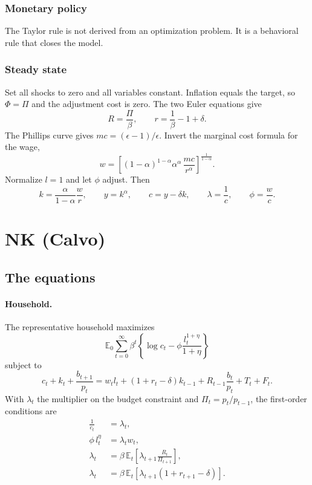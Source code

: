 \documentclass[11pt]{article}
\begin{document}
\subsubsection{Monetary policy}

The Taylor rule is not derived from an optimization problem. It is a behavioral rule that closes the model.

\subsubsection{Steady state}

Set all shocks to zero and all variables constant. Inflation equals the target, so $\Phi = \Pi$ and the adjustment cost is zero. The two Euler equations give
\begin{equation*}
R = \frac{\Pi}{\beta}, \qquad r = \frac{1}{\beta} - 1 + \delta .
\end{equation*}
The Phillips curve gives $mc = (\epsilon-1)/\epsilon$. Invert the marginal cost formula for the wage,
\begin{equation*}
w = \left[ (1-\alpha)^{1-\alpha} \alpha^{\alpha}\, \frac{mc}{r^{\alpha}} \right]^{\frac{1}{1-\alpha}} .
\end{equation*}
Normalize $l = 1$ and let $\phi$ adjust. Then
\begin{equation*}
k = \frac{\alpha}{1-\alpha} \frac{w}{r}, \qquad
y = k^{\alpha}, \qquad
c = y - \delta k, \qquad
\lambda = \frac{1}{c}, \qquad
\phi = \frac{w}{c} .
\end{equation*}

\section{NK (Calvo)}

\subsection{The equations}

\paragraph{Household.} The representative household maximizes
\begin{equation*}
\mathbb{E}_0 \sum_{t=0}^{\infty} \beta^t \left\{ \log c_t - \phi \frac{l_t^{1+\eta}}{1+\eta} \right\}
\end{equation*}
subject to
\begin{equation*}
c_t + k_t + \frac{b_{t+1}}{p_t} = w_t l_t + (1 + r_t - \delta) k_{t-1} + R_{t-1} \frac{b_t}{p_t} + T_t + F_t .
\end{equation*}
With $\lambda_t$ the multiplier on the budget constraint and $\Pi_t = p_t/p_{t-1}$, the first-order conditions are
\begin{align}
\frac{1}{c_t} &= \lambda_t, \\
\phi\, l_t^{\eta} &= \lambda_t w_t, \\
\lambda_t &= \beta\, \mathbb{E}_t \left[ \lambda_{t+1} \frac{R_t}{\Pi_{t+1}} \right], \\
\lambda_t &= \beta\, \mathbb{E}_t \left[ \lambda_{t+1} (1 + r_{t+1} - \delta) \right].
\end{align}
\end{document}
